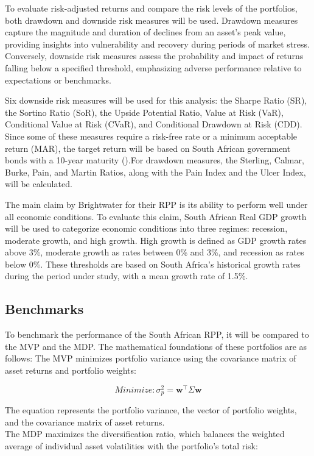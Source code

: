 \documentclass[11pt,preprint]{elsarticle}
\numberwithin{equation}{section}
\numberwithin{figure}{section}
\numberwithin{table}{section}
\begin{document}
To evaluate risk-adjusted returns and compare the risk levels of the
portfolios, both drawdown and downside risk measures will be used.
Drawdown measures capture the magnitude and duration of declines from an
asset's peak value, providing insights into vulnerability and recovery
during periods of market stress. Conversely, downside risk measures
assess the probability and impact of returns falling below a specified
threshold, emphasizing adverse performance relative to expectations or
benchmarks.

Six downside risk measures will be used for this analysis: the Sharpe
Ratio (SR), the Sortino Ratio (SoR), the Upside Potential Ratio, Value
at Risk (VaR), Conditional Value at Risk (CVaR), and Conditional
Drawdown at Risk (CDD). Since some of these measures require a risk-free
rate or a minimum acceptable return (MAR), the target return will be
based on South African government bonds with a 10-year maturity
().For drawdown
measures, the Sterling, Calmar, Burke, Pain, and Martin Ratios, along
with the Pain Index and the Ulcer Index, will be calculated.

The main claim by Brightwater for their RPP is its ability to perform
well under all economic conditions. To evaluate this claim, South
African Real GDP growth will be used to categorize economic conditions
into three regimes: recession, moderate growth, and high growth. High
growth is defined as GDP growth rates above 3\%, moderate growth as
rates between 0\% and 3\%, and recession as rates below 0\%. These
thresholds are based on South Africa's historical growth rates during
the period under study, with a mean growth rate of 1.5\%.

\subsection{Benchmarks}\label{benchmarks}

To benchmark the performance of the South African RPP, it will be
compared to the MVP and the MDP. The mathematical foundations of these
portfolios are as follows: The MVP minimizes portfolio variance using
the covariance matrix of asset returns and portfolio weights:

\begin{equation}
{Minimize:} \sigma_p^2 = \mathbf{w}^\top \Sigma \mathbf{w}
\end{equation}

The equation represents the portfolio variance, the vector of portfolio
weights, and the covariance matrix of asset returns.\\
The MDP maximizes the diversification ratio, which balances the weighted
average of individual asset volatilities with the portfolio's total
risk:
\end{document}
